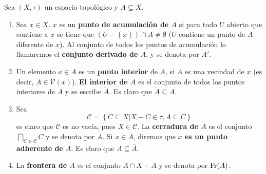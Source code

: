 \documentclass[12pt]{report}
\theoremstyle{largebreak}
\newcommand{\V}[1]{\ensuremath{\mathcal{V}(#1)}}
\newcommand{\Int}[1]{\ensuremath{\mathring{#1}}}
\newcommand{\Cls}[1]{\ensuremath{\overline{#1}}}
\newcommand{\Fr}[1]{\ensuremath{\textup{Fr}(#1)}}
\begin{document}
    \begin{mydef}
        Sea $(X,\tau)$ un espacio topológico y $A\subseteq X$.
        \begin{enumerate}
            \item Sea $x\in X$. $x$ es un \textbf{punto de acumulación de $A$} si para todo $U$ abierto que contiene a $x$ se tiene que $(U-\left\{x\right\})\cap A\neq\emptyset$ ($U$ contiene un punto de $A$ diferente de $x$). Al conjunto de todos los puntos de acumulación lo llamaremos el \textbf{conjunto derivado de $A$}, y se denota por $A'$.
            \item Un elemento $a\in A$ es un \textbf{punto interior} de $A$, si $A$ es una vecindad de $x$ (es decir, $A\in\V{x}$). 
            \textbf{El interior de $A$} es el conjunto de todos los puntos interiores de $A$ y se escribe $\Int{A}$. Es claro que $\Int{A}\subseteq A$.
            \item Sea
            \begin{equation*}
                \mathcal{C}=\left\{C\subseteq X\big|X-C\in\tau,A\subseteq C \right\}
            \end{equation*}
            es claro que $\mathcal{C}$ es no vacía, pues $X\in\mathcal{C}$. La \textbf{cerradura de $A$} es el conjunto $\bigcap_{C\in\mathcal{C}}C$ y se denota por $\overline{A}$. Si $x\in\overline{A}$, diremos que \textbf{$x$ es un punto adherente de $A$}. Es claro que $A\subseteq\overline{A}$.
            \item La \textbf{frontera de $A$} es el conjunto $\Cls{A}\cap\Cls{X-A}$ y se denota por $\Fr{A}$.
        \end{enumerate}
    \end{mydef}
\end{document}
